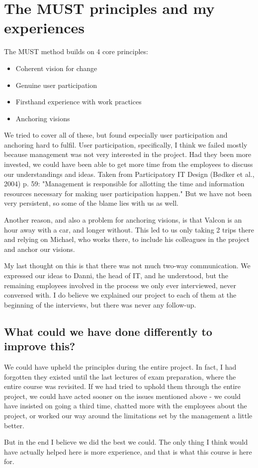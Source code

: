 \section*{The MUST principles and my experiences}
The MUST method builds on 4 core principles:
\begin{itemize}
\item Coherent vision for change
\item Genuine user participation
\item Firsthand experience with work practices
\item Anchoring visions
\end{itemize}
We tried to cover all of these, but found especially user participation and anchoring hard to fulfil.
User participation, specifically, I think we failed mostly because management was not very interested in the project.
Had they been more invested, we could have been able to get more time from the employees to discuss our understandings and ideas.
Taken from Participatory IT Design (Bødker et al., 2004) p. 59: "Management is responsible for allotting the time and information resources necessary for making user participation happen."
But we have not been very persistent, so some of the blame lies with us as well.

Another reason, and also a problem for anchoring visions, is that Valcon is an hour away with a car, and longer without.
This led to us only taking 2 trips there and relying on Michael, who works there, to include his colleagues in the project and anchor our visions.

My last thought on this is that there was not much two-way communication.
We expressed our ideas to Danni, the head of IT, and he understood, but the remaining employees involved in the process we only ever interviewed, never conversed with.
I do believe we explained our project to each of them at the beginning of the interviews, but there was never any follow-up.

\subsection*{What could we have done differently to improve this?}
We could have upheld the principles during the entire project.
In fact, I had forgotten they existed until the last lectures of exam preparation, where the entire course was revisited.
If we had tried to uphold them through the entire project, we could have acted sooner on the issues mentioned above - we could have insisted on going a third time, chatted more with the employees about the project, or worked our way around the limitations set by the management a little better.

But in the end I believe we did the best we could.
The only thing I think would have actually helped here is more experience, and that is what this course is here for.